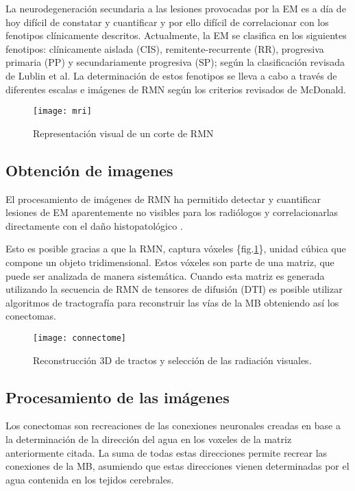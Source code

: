 \documentclass[fleqn,10pt]{UICArticle} %
\begin{document}
La neurodegeneración secundaria a las lesiones provocadas por la EM es a día de hoy difícil de constatar y cuantificar y por ello difícil de correlacionar con los fenotipos clínicamente descritos. Actualmente, la EM se clasifica en los siguientes fenotipos: clínicamente aislada (CIS), remitente-recurrente (RR), progresiva primaria (PP) y secundariamente progresiva (SP); según la clasificación revisada de Lublin et al\cite{Lublin2014}. La determinación de estos fenotipos se lleva a cabo a través de diferentes escalas e imágenes de RMN según los criterios revisados de McDonald\cite{Polman20112}.

\begin{figure}[!h]
	\centering
	\texttt{[image: mri]}
	\caption{Representación visual de un corte de RMN}
	\label{fig:voxeles}
\end{figure}

\subsection{Obtención de imagenes}

El procesamiento de imágenes de RMN ha permitido detectar y cuantificar lesiones de EM aparentemente no visibles para los radiólogos y correlacionarlas directamente con el daño histopatológico \cite{Beer2016}.

Esto es posible gracias a que la RMN, captura vóxeles \{fig.\ref{fig:voxeles}\}, unidad cúbica que compone un objeto tridimensional. Estos vóxeles son parte de una matriz, que puede ser analizada de manera sistemática. Cuando esta matriz es generada utilizando la secuencia de RMN de tensores de difusión (DTI) es posible utilizar algoritmos de tractografía para reconstruir las vías de la MB obteniendo así los conectomas.

\begin{figure}[h]
	\centering
	\texttt{[image: connectome]}
	\caption{Reconstrucción 3D de tractos y selección de las radiación visuales.}
	\label{fig:connectome}
\end{figure}

\subsection{Procesamiento de las imágenes}
Los conectomas son recreaciones de las conexiones neuronales creadas en base a la determinación de la dirección del agua en los voxeles de la matriz anteriormente citada. La suma de todas estas direcciones permite recrear las conexiones de la MB, asumiendo que estas direcciones vienen determinadas por el agua contenida en los tejidos cerebrales.
\end{document}
